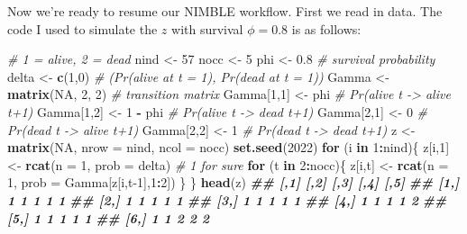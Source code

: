\documentclass[
  12pt,
]{krantz}
\newenvironment{Shaded}{\begin{snugshade}}{\end{snugshade}}
\newcommand{\AttributeTok}[1]{\textcolor[rgb]{0.13,0.29,0.53}{#1}}
\newcommand{\CommentTok}[1]{\textcolor[rgb]{0.56,0.35,0.01}{\textit{#1}}}
\newcommand{\ConstantTok}[1]{\textcolor[rgb]{0.56,0.35,0.01}{#1}}
\newcommand{\ControlFlowTok}[1]{\textcolor[rgb]{0.13,0.29,0.53}{\textbf{#1}}}
\newcommand{\DecValTok}[1]{\textcolor[rgb]{0.00,0.00,0.81}{#1}}
\newcommand{\DocumentationTok}[1]{\textcolor[rgb]{0.56,0.35,0.01}{\textbf{\textit{#1}}}}
\newcommand{\FloatTok}[1]{\textcolor[rgb]{0.00,0.00,0.81}{#1}}
\newcommand{\FunctionTok}[1]{\textcolor[rgb]{0.13,0.29,0.53}{\textbf{#1}}}
\newcommand{\NormalTok}[1]{#1}
\newcommand{\OtherTok}[1]{\textcolor[rgb]{0.56,0.35,0.01}{#1}}
\newcommand{\SpecialCharTok}[1]{\textcolor[rgb]{0.81,0.36,0.00}{\textbf{#1}}}
\begin{document}
Now we're ready to resume our NIMBLE workflow. First we read in data. The code I used to simulate the \(z\) with survival \(\phi = 0.8\) is as follows:

\begin{Shaded}
\begin{Highlighting}[]
\CommentTok{\# 1 = alive, 2 = dead}
\NormalTok{nind }\OtherTok{\textless{}{-}} \DecValTok{57}
\NormalTok{nocc }\OtherTok{\textless{}{-}} \DecValTok{5}
\NormalTok{phi }\OtherTok{\textless{}{-}} \FloatTok{0.8} \CommentTok{\# survival probability}
\NormalTok{delta }\OtherTok{\textless{}{-}} \FunctionTok{c}\NormalTok{(}\DecValTok{1}\NormalTok{,}\DecValTok{0}\NormalTok{) }\CommentTok{\# (Pr(alive at t = 1), Pr(dead at t = 1))}
\NormalTok{Gamma }\OtherTok{\textless{}{-}} \FunctionTok{matrix}\NormalTok{(}\ConstantTok{NA}\NormalTok{, }\DecValTok{2}\NormalTok{, }\DecValTok{2}\NormalTok{) }\CommentTok{\# transition matrix}
\NormalTok{Gamma[}\DecValTok{1}\NormalTok{,}\DecValTok{1}\NormalTok{] }\OtherTok{\textless{}{-}}\NormalTok{ phi      }\CommentTok{\# Pr(alive t {-}\textgreater{} alive t+1)}
\NormalTok{Gamma[}\DecValTok{1}\NormalTok{,}\DecValTok{2}\NormalTok{] }\OtherTok{\textless{}{-}} \DecValTok{1} \SpecialCharTok{{-}}\NormalTok{ phi  }\CommentTok{\# Pr(alive t {-}\textgreater{} dead t+1)}
\NormalTok{Gamma[}\DecValTok{2}\NormalTok{,}\DecValTok{1}\NormalTok{] }\OtherTok{\textless{}{-}} \DecValTok{0}        \CommentTok{\# Pr(dead t {-}\textgreater{} alive t+1)}
\NormalTok{Gamma[}\DecValTok{2}\NormalTok{,}\DecValTok{2}\NormalTok{] }\OtherTok{\textless{}{-}} \DecValTok{1}        \CommentTok{\# Pr(dead t {-}\textgreater{} dead t+1)}
\NormalTok{z }\OtherTok{\textless{}{-}} \FunctionTok{matrix}\NormalTok{(}\ConstantTok{NA}\NormalTok{, }\AttributeTok{nrow =}\NormalTok{ nind, }\AttributeTok{ncol =}\NormalTok{ nocc)}
\FunctionTok{set.seed}\NormalTok{(}\DecValTok{2022}\NormalTok{)}
\ControlFlowTok{for}\NormalTok{ (i }\ControlFlowTok{in} \DecValTok{1}\SpecialCharTok{:}\NormalTok{nind)\{}
\NormalTok{  z[i,}\DecValTok{1}\NormalTok{] }\OtherTok{\textless{}{-}} \FunctionTok{rcat}\NormalTok{(}\AttributeTok{n =} \DecValTok{1}\NormalTok{, }\AttributeTok{prob =}\NormalTok{ delta) }\CommentTok{\# 1 for sure}
  \ControlFlowTok{for}\NormalTok{ (t }\ControlFlowTok{in} \DecValTok{2}\SpecialCharTok{:}\NormalTok{nocc)\{}
\NormalTok{    z[i,t] }\OtherTok{\textless{}{-}} \FunctionTok{rcat}\NormalTok{(}\AttributeTok{n =} \DecValTok{1}\NormalTok{, }\AttributeTok{prob =}\NormalTok{ Gamma[z[i,t}\DecValTok{{-}1}\NormalTok{],}\DecValTok{1}\SpecialCharTok{:}\DecValTok{2}\NormalTok{]) }
\NormalTok{  \}}
\NormalTok{\}}
\FunctionTok{head}\NormalTok{(z) }
\DocumentationTok{\#\#      [,1] [,2] [,3] [,4] [,5]}
\DocumentationTok{\#\# [1,]    1    1    1    1    1}
\DocumentationTok{\#\# [2,]    1    1    1    1    1}
\DocumentationTok{\#\# [3,]    1    1    1    1    1}
\DocumentationTok{\#\# [4,]    1    1    1    1    2}
\DocumentationTok{\#\# [5,]    1    1    1    1    1}
\DocumentationTok{\#\# [6,]    1    1    2    2    2}
\end{Highlighting}
\end{Shaded}
\end{document}
